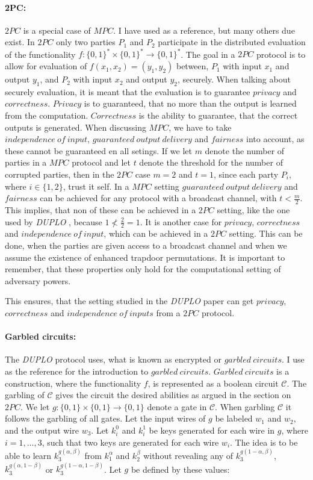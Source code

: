 \documentclass[twoside,11pt,openright]{report}
\newcommand{\DUPLO}{\textit{DUPLO} }
\begin{document}
\paragraph{2PC:}
$2PC$ is a special case of $MPC$. I have used \cite{estpp} as a reference, but many others due exist. In $2PC$ only two parties $P_1$ and $P_2$ participate in the distributed evaluation of the functionality $f: \{0,1\}^* \times \{0,1\}^* \to \{0,1\}^*$. The goal in a $2PC$ protocol is to allow for evaluation of $f(x_1,x_2)=(y_1,y_2)$ between, $P_1$ with input $x_1$ and output $y_1$, and $P_2$ with input $x_2$ and output $y_2$, securely. When talking about securely evaluation, it is meant that the evaluation is to guarantee $privacy$ and $correctness$. $Privacy$ is to guaranteed, that no more than the output is learned from the computation. $Correctness$ is the ability to guarantee, that the correct outputs is generated. When discussing $MPC$, we have to take $independence~of~input$, $guaranteed~output~delivery$ and $fairness$ into account, as these cannot be guaranteed en all setings. If we let $m$ denote the number of parties in a $MPC$ protocol and let $t$ denote the threshold for the number of corrupted parties, then in the $2PC$ case $m=2$ and $t=1$, since each party $P_i$, where $i\in\{1,2\}$, trust it self. In a $MPC$ setting $guaranteed~output~delivery$ and $fairness$ can be achieved for any protocol with a broadcast channel, with $t<\frac{m}{2}$. This implies, that non of these can be achieved in a $2PC$ setting, like the one used by \DUPLO, because $1\not<\frac{2}{2}=1$. It is another case for $privacy$, $correctness$ and $independence~of~input$, which can be achieved in a $2PC$ setting. This can be done, when the parties are given access to a broadcast channel and when we assume the existence of enhanced trapdoor permutations. It is important to remember, that these properties only hold for the computational setting of adversary powers.

This ensures, that the setting studied in the \DUPLO paper can get $privacy$, $correctness$ and $independence~of~inputs$ from a $2PC$ protocol.

\paragraph{Garbled circuits:} 
The \DUPLO protocol uses, what is known as encrypted or $garbled~circuits$. I use \cite{estpp} as the reference for the introduction to $garbled~circuits$. $Garbled~circuits$ is a construction, where the functionality $f$, is represented as a boolean circuit $\mathcal{C}$. The garbling of $\mathcal{C}$ gives the circuit the desired abilities as argued in the section on $2PC$. We let $g:\{0,1\}\times \{0,1\} \to \{0,1\}$ denote a gate in $\mathcal{C}$. When garbling $\mathcal{C}$ it follows the garbling of all gates. Let the input wires of $g$ be labeled $w_1$ and $w_2$, and the output wire $w_3$. Let $k^0_i$ and $k^1_i$ be keys generated for each wire in $g$, where $i=1,\dots,3$, such that two keys are generated for each wire $w_i$. The idea is to be able to learn $k^{g(\alpha,\beta)}_3$ from $k^\alpha_1$ and $k^\beta_2$ without revealing any of $k^{g(1-\alpha,\beta)}_3$, $k^{g(\alpha,1-\beta)}_3$ or $k^{g(1-\alpha,1-\beta)}_3$. Let $g$ be defined by these values:
\end{document}
